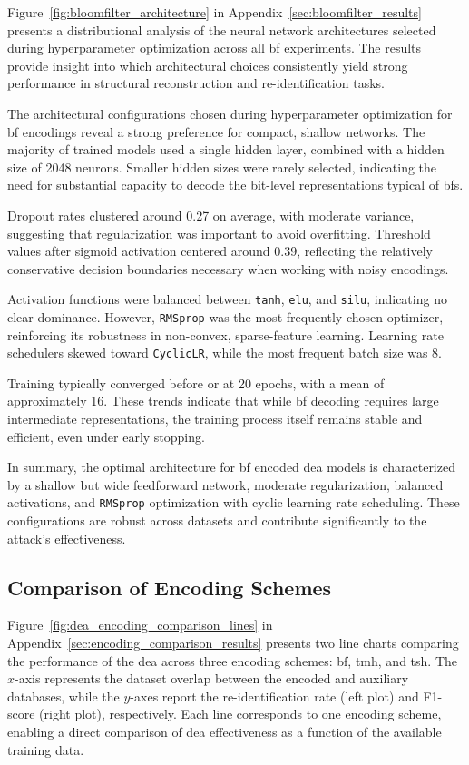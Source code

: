 Figure~\ref{fig:bloomfilter_architecture} in Appendix~\ref{sec:bloomfilter_results} presents a distributional analysis of the neural network architectures selected during hyperparameter optimization across all \ac{bf} experiments.
The results provide insight into which architectural choices consistently yield strong performance in structural reconstruction and re-identification tasks.

The architectural configurations chosen during hyperparameter optimization for \ac{bf} encodings reveal a strong preference for compact, shallow networks.
The majority of trained models used a single hidden layer, combined with a hidden size of 2048 neurons.
Smaller hidden sizes were rarely selected, indicating the need for substantial capacity to decode the bit-level representations typical of \ac{bf}s.

Dropout rates clustered around 0.27 on average, with moderate variance, suggesting that regularization was important to avoid overfitting.
Threshold values after sigmoid activation centered around 0.39, reflecting the relatively conservative decision boundaries necessary when working with noisy encodings.

Activation functions were balanced between \texttt{tanh}, \texttt{elu}, and \texttt{silu}, indicating no clear dominance.
However, \texttt{RMSprop} was the most frequently chosen optimizer, reinforcing its robustness in non-convex, sparse-feature learning.
Learning rate schedulers skewed toward \texttt{CyclicLR}, while the most frequent batch size was 8.

Training typically converged before or at 20 epochs, with a mean of approximately 16.
These trends indicate that while \ac{bf} decoding requires large intermediate representations, the training process itself remains stable and efficient, even under early stopping.

In summary, the optimal architecture for \ac{bf} encoded \ac{dea} models is characterized by a shallow but wide feedforward network, moderate regularization, balanced activations, and \texttt{RMSprop} optimization with cyclic learning rate scheduling.
These configurations are robust across datasets and contribute significantly to the attack's effectiveness.

\subsection{Comparison of Encoding Schemes}

Figure~\ref{fig:dea_encoding_comparison_lines} in Appendix~\ref{sec:encoding_comparison_results} presents two line charts comparing the performance of the \ac{dea} across three encoding schemes: \ac{bf}, \ac{tmh}, and \ac{tsh}.
The $x$-axis represents the dataset overlap between the encoded and auxiliary databases, while the $y$-axes report the re-identification rate (left plot) and F1-score (right plot), respectively.
Each line corresponds to one encoding scheme, enabling a direct comparison of \ac{dea} effectiveness as a function of the available training data.

